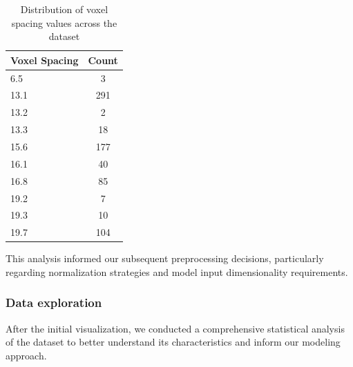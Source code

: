 \documentclass{article}
\begin{document}
\begin{table}[htb]
    \centering
    \caption{Representative examples from training labels demonstrating data structure}
    \label{tab:sample_labels}
\end{table}

\begin{table}[htb]
    \centering
    \caption{Distribution of voxel spacing values across the dataset}
    \begin{tabular}{lc}
        \toprule
        Voxel Spacing & Count \\
        \midrule
        6.5  & 3   \\
        13.1 & 291 \\
        13.2 & 2   \\
        13.3 & 18  \\
        15.6 & 177 \\
        16.1 & 40  \\
        16.8 & 85  \\
        19.2 & 7   \\
        19.3 & 10  \\
        19.7 & 104 \\
        \bottomrule
    \end{tabular}
    \label{tab:voxel_spacing}
\end{table}

This analysis informed our subsequent preprocessing decisions, particularly regarding normalization strategies and model input dimensionality requirements.

\subsubsection{Data exploration}
After the initial visualization, we conducted a comprehensive statistical analysis of the dataset to better understand its characteristics and inform our modeling approach.
\end{document}
